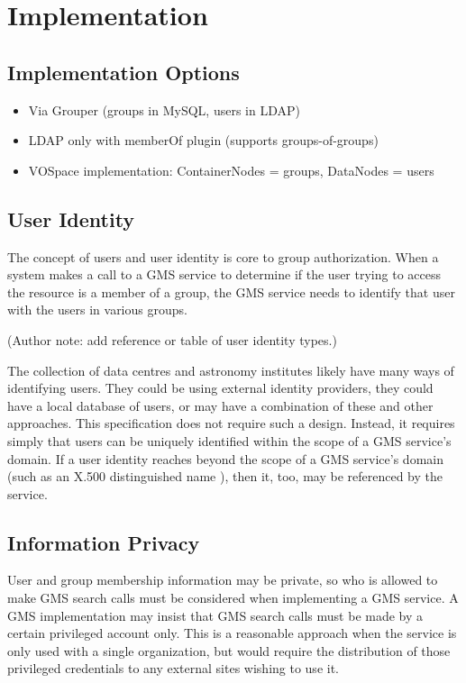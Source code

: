 \documentclass[11pt,a4paper]{ivoa}
\begin{document}
\section {Implementation}

\subsection {Implementation Options}

\begin{itemize}
\item Via Grouper (groups in MySQL, users in LDAP)
\item LDAP only with memberOf plugin (supports groups-of-groups)
\item VOSpace implementation: ContainerNodes = groups, DataNodes = users
\end{itemize}

\subsection{User Identity}

The concept of users and user identity is core to group authorization.  When a system makes a call to a GMS service to determine if the user trying to access the resource is a member of a group, the GMS service needs to identify that user with the users in various groups.

(Author note: add reference or table of user identity types.)

The collection of data centres and astronomy institutes likely have many ways of identifying users.  They could be using external identity providers, they could have a local database of users, or may have a combination of these and other approaches.  This specification does not require such a design.  Instead, it requires simply that users can be uniquely identified within the scope of a GMS service's domain.  If a user identity reaches beyond the scope of a GMS service's domain (such as an X.500 distinguished name \citep{std:RFC1779}), then it, too, may be referenced by the service.

\subsection{Information Privacy}

User and group membership information may be private, so who is allowed to make GMS search calls must be considered when implementing a GMS service.  A GMS implementation may insist that GMS search calls must be made by a certain privileged account only.  This is a reasonable approach when the service is only used with a single organization, but would require the distribution of those privileged credentials to any external sites wishing to use it.
\end{document}

